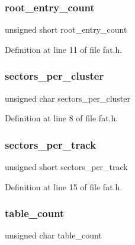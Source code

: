 \subsubsection{\texorpdfstring{root\+\_\+entry\+\_\+count}{root\_entry\_count}}
{\footnotesize\ttfamily unsigned short root\+\_\+entry\+\_\+count}



Definition at line 11 of file fat.\+h.

\mbox{\label{a00152_a78e26c23d518983e13881d4e0e53356a_a78e26c23d518983e13881d4e0e53356a}} 
\subsubsection{\texorpdfstring{sectors\+\_\+per\+\_\+cluster}{sectors\_per\_cluster}}
{\footnotesize\ttfamily unsigned char sectors\+\_\+per\+\_\+cluster}



Definition at line 8 of file fat.\+h.

\mbox{\label{a00152_a602ee4dea0c5142e60ebabb37adf3dd9_a602ee4dea0c5142e60ebabb37adf3dd9}} 
\subsubsection{\texorpdfstring{sectors\+\_\+per\+\_\+track}{sectors\_per\_track}}
{\footnotesize\ttfamily unsigned short sectors\+\_\+per\+\_\+track}



Definition at line 15 of file fat.\+h.

\mbox{\label{a00152_afc6604c21ae7038b249589ecd0560622_afc6604c21ae7038b249589ecd0560622}} 
\subsubsection{\texorpdfstring{table\+\_\+count}{table\_count}}
{\footnotesize\ttfamily unsigned char table\+\_\+count}



